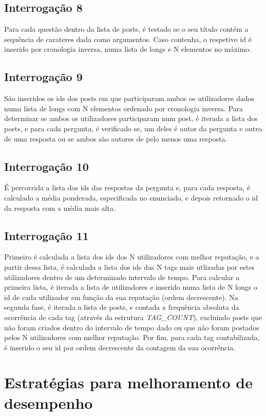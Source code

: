 \documentclass[10pt]{report}
\newcommand\tab[1][0.5cm]{\hspace*{#1}}
\begin{document}
\subsection{Interrogação 8}
\tab Para cada questão dentro da lista de posts, é testado se o seu título contém a sequência de carateres dada como argumentos. Caso contenha, o respetivo id é inserido por cronologia inversa, numa lista de longs e N elementos no máximo.

\subsection{Interrogação 9}
\tab São inseridos os ids dos posts em que participaram ambos os utilizadores dados numa lista de longs com N elementos ordenado por cronologia inversa. Para determinar se ambos os utilizadores participaram num post, é iterada a lista dos posts, e para cada pergunta, é verificado se, um deles é autor da pergunta e outro de uma resposta ou se ambos são autores de pelo menos uma resposta.

\subsection{Interrogação 10}
\tab É percorrida a lista dos ids das respostas da pergunta e, para cada resposta, é calculado a média ponderada, especificada no enunciado, e depois retornado o id da resposta com a média mais alta.

\subsection{Interrogação 11}
\tab Primeiro é calculada a lista dos ids dos N utilizadores com melhor reputação, e a partir dessa lista, é calculada a lista dos ids das N tags mais utlizadas por estes utilizadores dentro de um determinado intervalo de tempo. Para calcular a primeira lista, é iterada a lista de utilizadores e inserido numa lista de N longs o id de cada utilizador em função da sua reputação (ordem decrescente). Na segunda fase, é iterada a lista de posts, e contada a frequência absoluta da ocorrência de cada tag (através da estrutura \textit{TAG\_COUNT}), excluindo posts que não foram criados dentro do intervalo de tempo dado ou que não foram postados pelos N utilizadores com melhor reputação. Por fim, para cada tag contabilizada, é inserido o seu id por ordem decrescente da contagem da sua ocorrência.

\section{Estratégias para melhoramento de desempenho}
\end{document}
